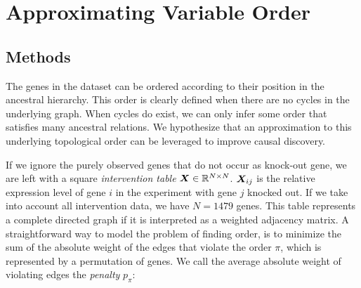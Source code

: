 \newpage
\section{Approximating Variable Order}
\label{chapter:methodorder}









\subsection{Methods}


The genes in the dataset can be ordered according to their position in the ancestral hierarchy. This order is clearly defined when there are no cycles in the underlying graph. When cycles do exist, we can only infer some order that satisfies many ancestral relations. We hypothesize that an approximation to this underlying topological order can be leveraged to improve causal discovery.

If we ignore the purely observed genes that do not occur as knock-out gene, we are left with a square \textit{intervention table} $\bm{X} \in \mathbb{R}^{N\times N}$. $\bm{X}_{ij}$ is the relative expression level of gene $i$ in the experiment with gene $j$ knocked out. If we take into account all intervention data, we have $N=1479$ genes. This table represents a complete directed graph if it is interpreted as a weighted adjacency matrix. A straightforward way to model the problem of finding order, is to minimize the sum of the absolute weight of the edges that violate the order $\pi$, which is represented by a permutation of genes. We call the average absolute weight of violating edges the \textit{penalty} $p_\pi$:

